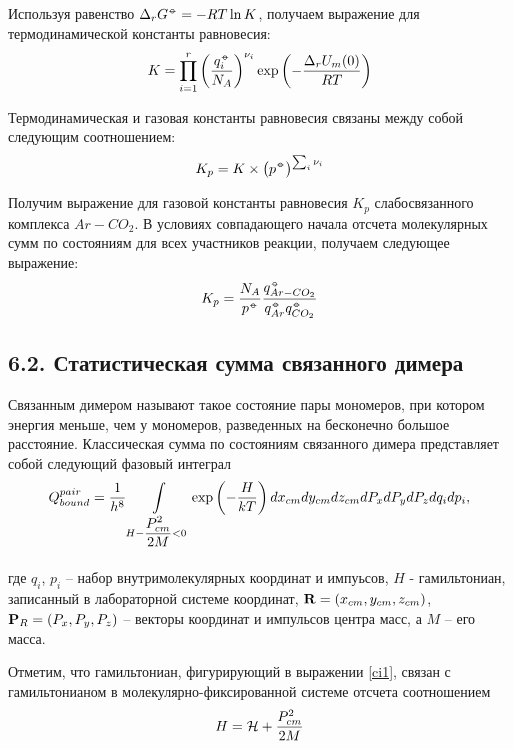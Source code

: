 Используя равенство $\Delta_r G^{\barcirc} = - RT \ln K$, получаем выражение для термодинамической константы равновесия:
\vverh
\begin{gather}
	K = \prod_{i = 1}^{r} \lb \frac{q_i^{\barcirc}}{N_A} \rb^{\nu_i} \exp \lb - \frac{\Delta_r U_m (0)}{RT} \rb \notag
\end{gather}

Термодинамическая и газовая константы равновесия связаны между собой следующим соотношением: 
\vverh
\begin{gather}
	K_p =  K \times \lb p^{\barcirc} \rb^{\sum_i \nu_i} \notag 
\end{gather}

Получим выражение для газовой константы равновесия $K_p$ слабосвязанного комплекса $Ar-CO_2$. В условиях совпадающего начала отсчета молекулярных сумм по состояниям для всех участников реакции, получаем следующее выражение:
\vverh
\begin{gather}
	K_p = \frac{N_A}{p^{\barcirc}} \frac{q_{Ar-CO_2}^{\barcirc}}{q_{Ar}^{\barcirc} q_{CO_2}^{\barcirc}} \label{eqconst}
\end{gather}

\subsection*{\textbf{6.2.} Статистическая сумма связанного димера} 

Связанным димером называют такое состояние пары мономеров, при котором энергия меньше, чем у мономеров, разведенных на бесконечно большое расстояние. Классическая сумма по состояниям связанного димера представляет собой следующий фазовый интеграл
\vverh
\begin{gather}
	Q_{bound}^{pair} = \frac{1}{h^8} \int\limits_{H - \frac{\displaystyle \strut P_{cm}^2}{\displaystyle \strut 2 M} < 0} \exp \left( - \frac{H}{k T} \right) d x_{cm} d y_{cm} d z_{cm} d P_{x} d P_{y} d P_{z} d q_i d p_i, \label{ci1}
\end{gather}

где $q_i$, $p_i$ -- набор внутримолекулярных координат и импуьсов, $H$ - гамильтониан, записанный в лабораторной системе координат, $\mathbf{R} = \left( x_{cm}, y_{cm}, z_{cm} \right)$, $\mathbf{P}_R = \left( P_x, P_y, P_z \right)$ -- векторы координат и импульсов центра масс, а $M$ -- его масса. \par
Отметим, что гамильтониан, фигурирующий в выражении \eqref{ci1}, связан с гамильтонианом в молекулярно-фиксированной системе отсчета соотношением
\vverh
\begin{gather}
	H = \mathcal{H} + \frac{P_{cm}^2}{2 M} \notag
\end{gather}

